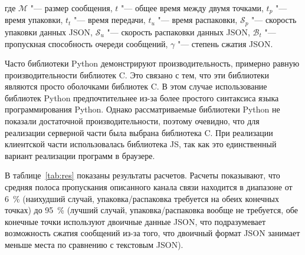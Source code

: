 \noindent где ${\mathcal{M}}$ "--- размер сообщения, $t$ "--- общее время между двумя точками, $t_p$ "--- время упаковки, $t_t$ "--- время передачи, $t_u$ "--- время распаковки, $\mathcal{S}_p$ "--- скорость упаковки данных JSON, $\mathcal{S}_u$ "--- скорость распаковки данных JSON, $\mathcal{B}_t$ "--- пропускная способность очереди сообщений, $\gamma$ "--- степень сжатия JSON.

Часто библиотеки Python демонстрируют производительность, примерно равную производительности библиотек C. Это связано с тем, что эти библиотеки являются просто оболочками библиотек C. В этом случае использование библиотек Python предпочтительнее из-за более простого синтаксиса языка программирования Python. Однако рассматриваемые библиотеки Python не показали достаточной производительности, поэтому очевидно, что для реализации серверной части была выбрана библиотека C. При реализации клиентской части использовалась библиотека JS, так как это единственный вариант реализации программ в браузере.

В таблице~\cref{tab:res} показаны результаты расчетов. Расчеты показывают, что средняя полоса пропускания описанного канала связи находится в диапазоне от \SI{6}{\percent} (наихудший случай, упаковка/распаковка требуется на обеих конечных точках) до \SI{95}{\percent} (лучший случай, упаковка/распаковка вообще не требуется, обе конечные точки используют двоичные данные JSON, что подразумевает возможность сжатия сообщений из-за того, что двоичный формат JSON занимает меньше места по сравнению с текстовым JSON).

